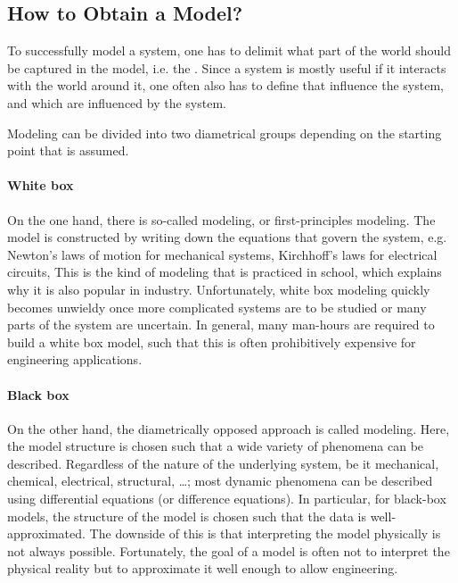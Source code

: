 \subsection{How to Obtain a Model?}

To successfully model a system, one has to delimit what part of the world should be captured in the model, i.e. the .
Since a system is mostly useful if it interacts with the world around it, one often also has to define  that influence the system, and  which are influenced by the system.

Modeling can be divided into two diametrical groups depending on the starting point that is assumed.

\paragraph{White box}
On the one hand, there is so-called  modeling, or first-principles modeling.
The model is constructed by writing down the equations that govern the system, e.g. Newton's laws of motion for mechanical systems, Kirchhoff's laws for electrical circuits, 
This is the kind of modeling that is practiced in school, which explains why it is also popular in industry.
Unfortunately, white box modeling quickly becomes unwieldy once more complicated systems are to be studied or many parts of the system are uncertain.
In general, many man-hours are required to build a white box model, such that this is often prohibitively expensive for engineering applications.

\paragraph{Black box}
On the other hand, the diametrically opposed approach is called  modeling.
Here, the model structure is chosen such that a wide variety of phenomena can be described.
Regardless of the nature of the underlying system, be it mechanical, chemical, electrical, structural, \ldots; most dynamic phenomena can be described using differential equations (or difference equations).
In particular, for black-box models, the structure of the model is chosen such that the data is well-approximated.
The downside of this is that interpreting the model physically is not always possible.
Fortunately, the goal of a model is often not to interpret the physical reality but to approximate it well enough to allow engineering.

